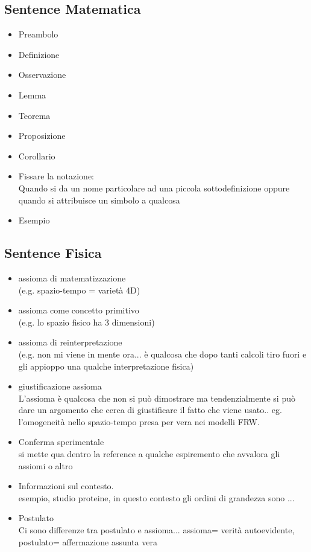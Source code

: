 \documentclass[a4paper,12pt]{report}
\begin{document}
\subsection{Sentence Matematica}

\begin{itemize}
 \item Preambolo
 \item Definizione
 \item Osservazione
 \item Lemma
 \item Teorema
 \item Proposizione
 \item Corollario
 \item Fissare la notazione:
 	\\ Quando si da un nome particolare ad una piccola sottodefinizione oppure quando si attribuisce un simbolo a qualcosa
 \item Esempio 	
 \end{itemize}

\subsection{Sentence Fisica}
\begin{itemize}
 \item assioma di matematizzazione 
 	\\(e.g. spazio-tempo = varietà 4D)
 \item assioma come concetto primitivo 
 	\\(e.g. lo spazio fisico ha 3 dimensioni)
 \item assioma di reinterpretazione 
 	\\(e.g. non mi viene in mente ora... è qualcosa che dopo tanti calcoli tiro fuori e gli appioppo una qualche interpretazione fisica)
 \item giustificazione assioma 
 	\\L'assioma è qualcosa che non si può dimostrare ma tendenzialmente si può dare un argomento che cerca di giustificare il fatto che viene usato.. eg. l'omogeneità nello spazio-tempo presa per vera nei modelli FRW.
 \item Conferma sperimentale
 	\\ si mette qua dentro la reference a qualche espiremento che avvalora gli assiomi o altro
 \item Informazioni sul contesto.
 	\\ esempio, studio proteine, in questo contesto gli ordini di grandezza sono ...
 \item Postulato
 	\\Ci sono differenze tra postulato e assioma... assioma= verità autoevidente, postulato= affermazione assunta vera


\end{itemize}
\end{document}
